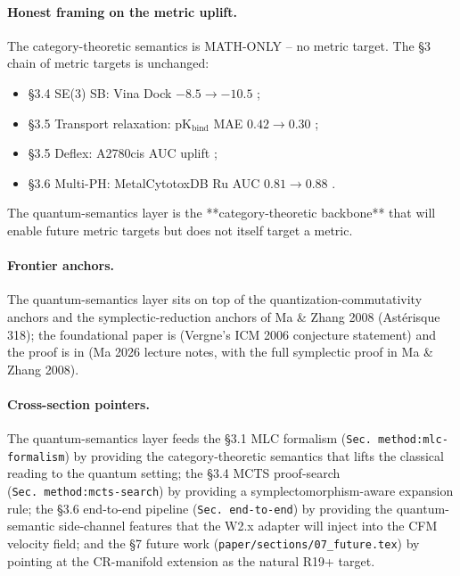 \paragraph{Honest framing on the metric uplift.}
The category-theoretic semantics is MATH-ONLY -- no metric
target.  The §3 chain of metric targets is unchanged:
\begin{itemize}
  \item §3.4 SE(3) SB: Vina Dock $-8.5 \to -10.5$ \PROJECTED;
  \item §3.5 Transport relaxation: pK$_\text{bind}$ MAE
    $0.42 \to 0.30$ \PROJECTED;
  \item §3.5 Deflex: A2780cis AUC uplift \PROJECTED;
  \item §3.6 Multi-PH: MetalCytotoxDB Ru AUC
    $0.81 \to 0.88$ \PROJECTED.
\end{itemize}
The quantum-semantics layer is the **category-theoretic
backbone** that will enable future metric targets but does not
itself target a metric.

\paragraph{Frontier anchors.}
The quantum-semantics layer sits on top of the
quantization-commutativity anchors
\cite{maxiaonan2026quantization,vergne2006quantization}
and the symplectic-reduction anchors of Ma \& Zhang 2008
(Astérisque 318); the foundational paper is
\cite{vergne2006quantization} (Vergne's ICM 2006 conjecture
statement) and the proof is in
\cite{maxiaonan2026quantization} (Ma 2026 lecture notes, with
the full symplectic proof in Ma \& Zhang 2008).

\paragraph{Cross-section pointers.}
The quantum-semantics layer feeds the §3.1 MLC formalism
(\texttt{Sec.~method:mlc-formalism}) by providing the
category-theoretic semantics that lifts the classical reading
to the quantum setting; the §3.4 MCTS proof-search
(\texttt{Sec.~method:mcts-search}) by providing a
symplectomorphism-aware expansion rule; the §3.6 end-to-end
pipeline (\texttt{Sec.~end-to-end}) by providing the
quantum-semantic side-channel features that the W2.x adapter
will inject into the CFM velocity field; and the §7 future work
(\texttt{paper/sections/07\_future.tex}) by pointing at the
CR-manifold extension as the natural R19+ target.

\makeatletter
\let\cite\WForigCiteQSem
\makeatother